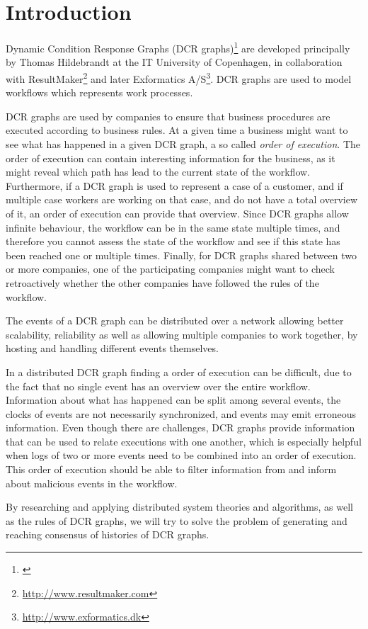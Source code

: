 \chapter{Introduction}
	Dynamic Condition Response Graphs (DCR graphs)\footnote{\cite{hildebrandt2011declarative}} are developed principally by Thomas Hildebrandt at the IT University of Copenhagen, in collaboration with ResultMaker\footnote{\url{http://www.resultmaker.com}} and later Exformatics A/S\footnote{\url{http://www.exformatics.dk}}. DCR graphs are used to model workflows which represents work processes.
	
	\newpar DCR graphs are used by companies to ensure that business procedures are executed according to business rules. At a given time a business might want to see what has happened in a given DCR graph, a so called \textit{order of execution}. The order of execution can contain interesting information for the business, as it might reveal which path has lead to the current state of the workflow. Furthermore, if a DCR graph is used to represent a case of a customer, and if multiple case workers are working on that case, and do not have a total overview of it, an order of execution can provide that overview. Since DCR graphs allow infinite behaviour, the workflow can be in the same state multiple times, and therefore you cannot assess the state of the workflow and see if this state has been reached one or multiple times. Finally, for DCR graphs shared between two or more companies, one of the participating companies might want to check retroactively whether the other companies have followed the rules of the workflow.
	
	\newpar The events of a DCR graph can be distributed over a network allowing better scalability, reliability as well as allowing multiple companies to work together, by hosting and handling different events themselves.
	
	\newpar In a distributed DCR graph finding a order of execution can be difficult, due to the fact that no single event has an overview over the entire workflow. Information about what has happened can be split among several events, the clocks of events are not necessarily synchronized, and events may emit erroneous information. Even though there are challenges, DCR graphs provide information that can be used to relate executions with one another, which is especially helpful when logs of two or more events need to be combined into an order of execution. This order of execution should be able to filter information from and inform about malicious events in the workflow.

	
	\newpar By researching and applying distributed system theories and algorithms, as well as the rules of DCR graphs, we will try to solve the problem of generating and reaching consensus of histories of DCR graphs. 
